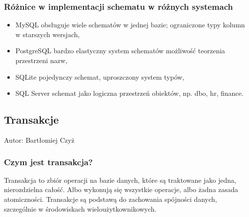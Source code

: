 \documentclass[a4paper,11pt,openany,english]{sphinxmanual}
\begin{document}
\subsubsection{Różnice w implementacji schematu w różnych systemach}
\label{\detokenize{rozdzial2/Kontrola_i_konserwacja/kontrola_i_konserwacja:roznice-w-implementacji-schematu-w-roznych-systemach}}\begin{itemize}
\item {} 
\sphinxAtStartPar
MySQL \sphinxhyphen{} obsługuje wiele schematów w jednej bazie; ograniczone typy kolumn w starszych wersjach,

\item {} 
\sphinxAtStartPar
PostgreSQL \sphinxhyphen{} bardzo elastyczny system schematów \sphinxhyphen{} możliwość teorzenia przestrzeni nazw,

\item {} 
\sphinxAtStartPar
SQLite \sphinxhyphen{} pojedynczy schemat, uproszczony system typów,

\item {} 
\sphinxAtStartPar
SQL Server \sphinxhyphen{} schemat jako logiczna przestrzeń obiektów, np. dbo, hr, finance.

\end{itemize}


\subsection{Transakcje}
\label{\detokenize{rozdzial2/Kontrola_i_konserwacja/kontrola_i_konserwacja:transakcje}}
\sphinxAtStartPar
Autor: Bartłomiej Czyż


\subsubsection{Czym jest transakcja?}
\label{\detokenize{rozdzial2/Kontrola_i_konserwacja/kontrola_i_konserwacja:czym-jest-transakcja}}
\sphinxAtStartPar
Transakcja to zbiór operacji na bazie danych, które są traktowane jako jedna, nierozdzielna całość. Albo wykonują się wszystkie operacje, albo żadna \sphinxhyphen{} zasada atomiczności. Transakcje są podstawą do zachowania spójności danych, szczególnie w środowiskach wieloużytkownikowych.
\end{document}
